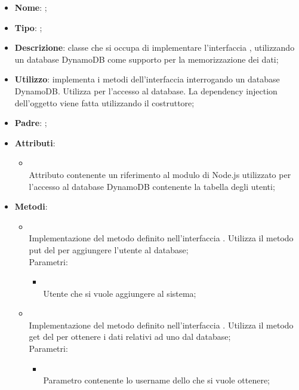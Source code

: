 \begin{itemize}
	\item \textbf{Nome}: ;
	\item \textbf{Tipo}: ;
	\item \textbf{Descrizione}: classe che si occupa di implementare l'interfaccia , utilizzando un database DynamoDB come supporto per la memorizzazione dei dati;
	\item \textbf{Utilizzo}: implementa i metodi dell'interfaccia  interrogando un database DynamoDB. Utilizza  per l'accesso al database. La dependency injection dell'oggetto  viene fatta utilizzando il costruttore;
	\item \textbf{Padre}: ;
	\item \textbf{Attributi}:
	\begin{itemize}
		\item[]  \\
		Attributo contenente un riferimento al modulo di Node.js utilizzato per l'accesso al database DynamoDB contenente la tabella degli utenti;
	\end{itemize}
	\item \textbf{Metodi}:
	\begin{itemize}
		\item[]  \\
		Implementazione del metodo definito nell'interfaccia . Utilizza il metodo put del  per aggiungere l'utente al database;\\
		Parametri:
		\begin{itemize}
			\item {} \\
			Utente che si vuole aggiungere al sistema;
		\end{itemize}
		\item[]  \\
		Implementazione del metodo definito nell'interfaccia . Utilizza il metodo get del  per ottenere i dati relativi ad uno  dal database;\\
		Parametri:
		\begin{itemize}
			\item {} \\
			Parametro contenente lo username dello  che si vuole ottenere;

\end{itemize}
\end{itemize}
\end{itemize}
